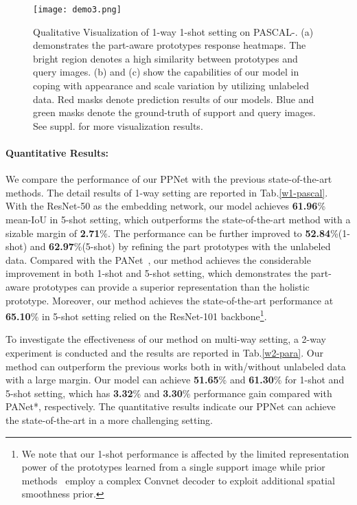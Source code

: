 \documentclass[runningheads]{llncs}
\begin{document}
\begin{figure}[ht]
  \centering
  \texttt{[image: demo3.png]}
  \caption{{\small Qualitative Visualization of 1-way 1-shot setting on PASCAL-}. (a) demonstrates the part-aware prototypes response heatmaps. The bright region denotes a high similarity between prototypes and query images. (b) and (c) show the capabilities of our model in coping with appearance and scale variation by utilizing unlabeled data. {\color{red} Red masks} denote prediction results of our models. {\color{blue} Blue} and {\color{green}green} masks denote the ground-truth of support and query images. See suppl. for more visualization results.}
  \label{demo} 
\end{figure}
\paragraph{{\rm\textbf{Quantitative Results:}}} 
We compare the performance of our PPNet with the previous state-of-the-art methods. The detail results of 1-way setting are reported in Tab.\ref{w1-pascal}. With the ResNet-50 as the embedding network, our model achieves \textbf{61.96}\% mean-IoU in 5-shot setting, which outperforms the state-of-the-art method with a sizable margin of \textbf{2.71}\%. The performance can be further improved to \textbf{52.84}\%(1-shot) and \textbf{62.97}\%(5-shot) by refining the part prototypes with the unlabeled data. Compared with the PANet~\cite{wang2019panet}, our method achieves the considerable improvement in both 1-shot and 5-shot setting, which demonstrates the part-aware prototypes can provide a superior representation than the holistic prototype. 
Moreover, our method achieves the state-of-the-art performance at \textbf{65.10}\% in 5-shot setting relied on the ResNet-101 backbone\footnote{We note that our 1-shot performance is affected by the limited representation power of the prototypes learned from a single support image while prior methods~\cite{zhang2019pyramid,zhang2019canet} employ a complex Convnet decoder to exploit additional spatial smoothness prior.}.


To investigate the effectiveness of our method on multi-way setting, a 2-way experiment is conducted and the results are reported in Tab.\ref{w2-para}. Our method can outperform the previous works both in with/without unlabeled data with a large margin. Our model can achieve \textbf{51.65}\% and \textbf{61.30}\% for 1-shot and 5-shot setting, which has \textbf{3.32}\% and \textbf{3.30}\% performance gain compared with PANet*, respectively. The quantitative results indicate our PPNet can achieve the state-of-the-art in a more challenging setting.
\end{document}
